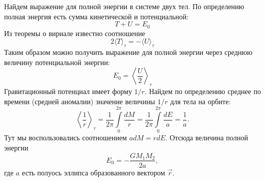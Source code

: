 Найдем выражение для полной энергии в системе двух тел. По определению полная энергия есть сумма кинетической и потенциальной:
\begin{equation*}
	T + U = E_0
\end{equation*}
Из теоремы о вириале известно соотношение
\begin{equation*}
	2\langle T \rangle_\tau = -\langle U \rangle_\tau
\end{equation*}
Таким образом можно получить выражение для полной энергии через среднюю величину потенциальной энергии:
\begin{equation*}
	E_0 = \left\langle \frac{U}{2} \right\rangle_\tau
\end{equation*}
Гравитационный потенциал имеет форму $1/r$. Найдем по определению среднее по времени (средней аномалии) значение величины $1/r$ для тела на орбите:
\begin{equation*}
	\left\langle \frac{1}{r} \right\rangle_\tau = \frac{1}{2 \pi} \int\limits_0^{2\pi}\frac{dM}{r} = \frac{1}{2 \pi} \int\limits_0^{2\pi}\frac{dE}{a} = \frac{1}{a}.
\end{equation*}
Тут мы воспользовались соотношением $a dM = r dE$. Отсюда величина полной энергии
\begin{equation*}
	E_0 = -\frac{G M_1 M_2}{2a},
\end{equation*}
где $a$ есть полуось эллипса образованного вектором $\vec{r}$.





